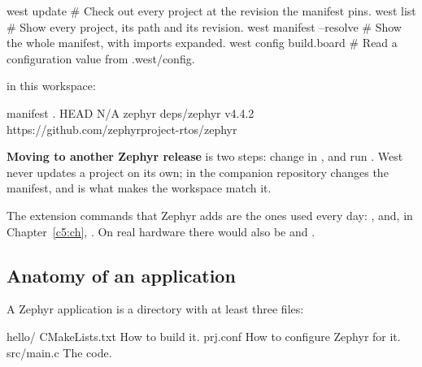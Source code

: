 \begin{shell}
west update                  # Check out every project at the revision the manifest pins.
west list                    # Show every project, its path and its revision.
west manifest --resolve      # Show the whole manifest, with imports expanded.
west config build.board      # Read a configuration value from .west/config.
\end{shell}

\noindent {} in this workspace:

\begin{console}
manifest     .                            HEAD                                     N/A
zephyr       deps/zephyr                  v4.4.2                                   https://github.com/zephyrproject-rtos/zephyr
\end{console}

\noindent \textbf{Moving to another Zephyr release} is two steps: change  in
, and run . West never updates a project on its own;  in the companion repository changes the manifest, and  is what makes the
workspace match it.

The extension commands that Zephyr adds are the ones used every day: , and, in
Chapter~\ref{c5:ch}, . On real hardware there would also be  and
.

\subsection{Anatomy of an application}
A Zephyr application is a directory with at least three files:

\begin{console}
hello/
    CMakeLists.txt      How to build it.
    prj.conf            How to configure Zephyr for it.
    src/main.c          The code.
\end{console}

\subsubsection{}

